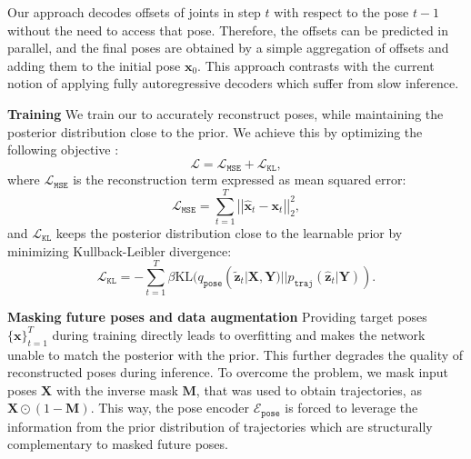 \documentclass[10pt,twocolumn,letterpaper]{article}
\newcommand{\code}[1]{\texttt{#1}}
\renewcommand{\bar}[1]{\widetilde{#1}}
\renewcommand{\hat}[1]{\widehat{#1}}
\renewcommand{\paragraph}[1]{\noindent\textbf{#1}\enskip}
\begin{document}
Our approach decodes offsets of joints in step $t$ with respect to the pose $t-1$ without the need to access that pose. Therefore, the offsets can be predicted in parallel, and the final poses are obtained by a simple aggregation of offsets and adding them to the initial pose $\mathbf{x}_0$. This approach contrasts with the current notion of applying fully autoregressive decoders \cite{zhang2020we, yuan2020dlow, henter2020moglow} which suffer from slow inference. 

\paragraph{Training}  We train our \trajevae{} to accurately reconstruct poses, while maintaining the
posterior distribution close to the prior. We achieve this by 
optimizing the following objective \cite{kingma2013auto}:
\begin{equation}
    \label{eq:objective}
    \mathcal{L} = \mathcal{L}_\code{MSE} + \mathcal{L}_\code{KL},
\end{equation}
where $\mathcal{L}_\code{MSE}$ is the reconstruction term expressed as mean squared error:
\begin{equation}
    \label{eq:mse}
    \mathcal{L}_\code{MSE} = \sum_{t=1}^T\left|\left|\hat{\mathbf{x}}_t - \mathbf{x}_t\right|\right|^2_2,
\end{equation}
and $\mathcal{L}_\code{KL}$ keeps the posterior distribution close to the learnable prior by minimizing Kullback-Leibler divergence:
\begin{equation}
    \label{eq:kl}
    \mathcal{L}_\code{KL} = -\sum_{t=1}^T\beta\text{KL}(q_\code{pose}(\bar{\mathbf{z}}_t | \mathbf{X}, \mathbf{Y})||p_\code{traj}(\hat{\mathbf{z}}_t | \mathbf{Y})) .
\end{equation}




\paragraph{Masking future poses and data augmentation} Providing target poses $\{\mathbf{x}\}_{t=1}^T$
during training directly leads to overfitting and makes the network
unable to match the posterior with the prior. This further degrades the quality of reconstructed poses during inference. To overcome the problem, we mask input poses $\mathbf{X}$ with the inverse mask $\mathbf{M}$, that was used to obtain trajectories, as $\mathbf{X} \odot \left(1 - \mathbf{M}\right)$. 
This way, the pose encoder $\mathcal{E}_\code{pose}$ is
forced to leverage the information from the prior distribution of trajectories
which are structurally complementary to masked future poses.
\end{document}
